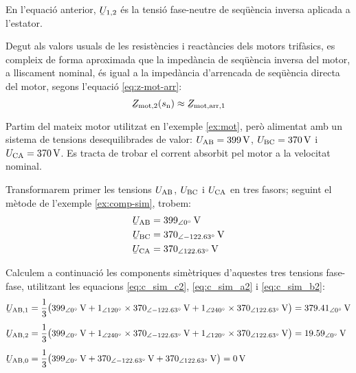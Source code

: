 En l'equació anterior, $\cmplx{U}_{1,2}$ és la tensió  fase-neutre de seqüència inversa aplicada a l’estator.

Degut als valors usuals de les resistències i reactàncies dels motors trifàsics, es compleix de forma aproximada que la impedància de seqüència inversa del motor, a lliscament nominal,  és igual a la impedància d'arrencada de seqüència directa del motor, segons l'equació \eqref{eq:z-mot-arr}:
\begin{equation}
	\cmplx{Z}\ped{mot,2}(s\ped{n}) \approx \cmplx{Z}\ped{mot,arr,1}\label{eq:Zarr-aprox-Z2}
\end{equation}


\begin{exemple}\label{ex:mot-tens-deseq}
	Partim del mateix motor utilitzat en l'exemple \vref{ex:mot}, però alimentat amb un sistema de tensions desequilibrades de valor: $U_\mathrm{AB} =
	\SI{399}{V}$, $U_\mathrm{BC} = \SI{370}{V}$ i
	$U_\mathrm{CA} = \SI{370}{V}$. Es tracta de trobar el corrent absorbit pel motor a la velocitat nominal.
	
	Transformarem primer les tensions $U_\mathrm{AB}$, $U_\mathrm{BC}$ i $U_\mathrm{CA}$ en tres fasors; seguint el mètode de l'exemple \vref{ex:comp-sim}, trobem:
	\begin{align*}
		\cmplx{U}\ped{AB} &= \SIpd{399}{0}{V} \\
		\cmplx{U}\ped{BC} &= \SIpd{370}{-122,63}{V} \\
		\cmplx{U}\ped{CA} &= \SIpd{370}{122,63}{V}
	\end{align*}
	
	Calculem a continuació les components simètriques d'aquestes tres tensions fase-fase, utilitzant les equacions
	\eqref{eq:c_sim_c2}, \eqref{eq:c_sim_a2} i \eqref{eq:c_sim_b2}:
	\begin{align*}
	\cmplx{U}\ped{AB,1} &= \frac{1}{3} \big(
	\SIpd{399}{0}{V} + \numpd{1}{120} \times \SIpd{370}{-122,63}{V} +
	\numpd{1}{240} \times \SIpd{370}{122,63}{V}\big) = \SIpd{379,41}{0}{V} \\[1ex]
	\cmplx{U}\ped{AB,2} &= \frac{1}{3} \big(
	\SIpd{399}{0}{V} + \numpd{1}{240} \times \SIpd{370}{-122,63}{V} +
	\numpd{1}{120} \times \SIpd{370}{122,63}{V} \big) = \SIpd{19,59}{0}{V} \\[1ex]
	\cmplx{U}\ped{AB,0} &= \frac{1}{3} \big(
	\SIpd{399}{0}{V} + \SIpd{370}{-122,63}{V} + \SIpd{370}{122,63}{V}\big) = \SI{0}{V}
	\end{align*}
	

\end{exemple}
